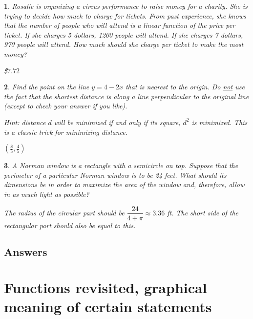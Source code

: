 \documentclass{amsbook}
\newtheorem{exc}{}
\newenvironment{ex}{\begin{exc}\normalfont}{\end{exc}}
\numberwithin{section}{chapter}
\numberwithin{equation}{chapter}
\begin{document}
\begin{ex} %
	Rosalie is organizing a circus performance to raise money for a charity. She is trying to decide how much to charge for tickets. From past experience, she knows that the number of people who will attend is a linear function of the price per ticket. If she charges 5 dollars, 1200 people will attend. If she charges 7 dollars, 970 people will attend. How much should she charge per ticket to make the most money?
	\begin{sol}
		\$$7.72$
	\end{sol}
\end{ex}
\begin{ex}
	Find the point on the line $y=4-2x$ that is nearest to the origin. Do \underline{not} use the fact that the shortest distance is along a line perpendicular to the original line (except to check your answer if you like).
	
	Hint: distance $d$ will be minimized if and only if its square, $d^2$ is minimized. This is a classic trick for minimizing distance.
	\begin{sol}
		$\left(\frac{8}{5}, \frac{4}{5}\right)$
	\end{sol}
\end{ex}
\begin{ex} %
	A Norman window is a rectangle with a semicircle on top. Suppose that the perimeter of a particular Norman window is to be 24 feet. What should its dimensions be in order to maximize the area of the window and, therefore, allow in as much light as possible?
	\begin{sol}
		The radius of the circular part should be $\dfrac{24}{4+\pi} \approx 3.36$ ft. The short side of the rectangular part should also be equal to this.
	\end{sol}
\end{ex}



\subsection*{Answers \nopunct} \hfill
\begin{multicols}{2}
	
\end{multicols}



\newpage
\section{Functions revisited, graphical meaning of certain statements}
\end{document}
